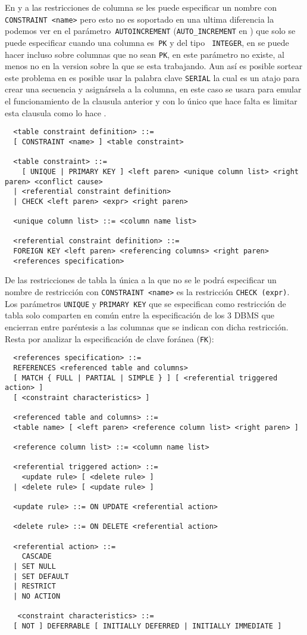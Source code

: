 En \s y \p a las restricciones de columna se les puede especificar un nombre con \verb=CONSTRAINT <name>= pero esto no es soportado en \m una ultima diferencia la podemos ver en el parámetro\verb= AUTOINCREMENT= (\verb=AUTO_INCREMENT= en \m) que solo se puede especificar cuando una columna es\verb= PK= y del tipo \verb= INTEGER=, en \m se puede hacer incluso sobre columnas que no sean \verb=PK=, en \p este parámetro no existe, al menos no en la version  sobre la que se esta trabajando. Aun así es posible sortear este problema en \p es posible usar la palabra clave \verb=SERIAL= la cual es un atajo para crear una secuencia y asignársela a la columna, en este caso se usara para emular el funcionamiento de la clausula anterior y con \m lo único que hace falta es limitar esta clausula como lo hace \s.   
%
\begin{Verbatim}
  <table constraint definition> ::=
  [ CONSTRAINT <name> ] <table constraint>

  <table constraint> ::=
    [ UNIQUE | PRIMARY KEY ] <left paren> <unique column list> <right paren> <conflict cause>
  | <referential constraint definition>
  | CHECK <left paren> <expr> <right paren>

  <unique column list> ::= <column name list>

  <referential constraint definition> ::=
  FOREIGN KEY <left paren> <referencing columns> <right paren>
  <references specification>
\end{Verbatim}
%
De las restricciones de tabla la única a la que no se le podrá especificar un nombre de restricción con \verb=CONSTRAINT <name>= es la restricción \verb=CHECK (expr)=. Los parámetros \verb=UNIQUE= y \verb=PRIMARY KEY= que se especifican como restricción de tabla solo comparten en común entre la especificación de los 3 DBMS que encierran entre paréntesis a las columnas que se indican con dicha restricción. Resta por analizar la especificación de clave foránea (\verb=FK=):    
%
\begin{Verbatim}
  <references specification> ::=
  REFERENCES <referenced table and columns>
  [ MATCH { FULL | PARTIAL | SIMPLE } ] [ <referential triggered action> ]
  [ <constraint characteristics> ]

  <referenced table and columns> ::=
  <table name> [ <left paren> <reference column list> <right paren> ]

  <reference column list> ::= <column name list>

  <referential triggered action> ::=
    <update rule> [ <delete rule> ]
  | <delete rule> [ <update rule> ]

  <update rule> ::= ON UPDATE <referential action>

  <delete rule> ::= ON DELETE <referential action>

  <referential action> ::=
    CASCADE
  | SET NULL
  | SET DEFAULT
  | RESTRICT
  | NO ACTION

   <constraint characteristics> ::=
  [ NOT ] DEFERRABLE [ INITIALLY DEFERRED | INITIALLY IMMEDIATE ]
\end{Verbatim}

